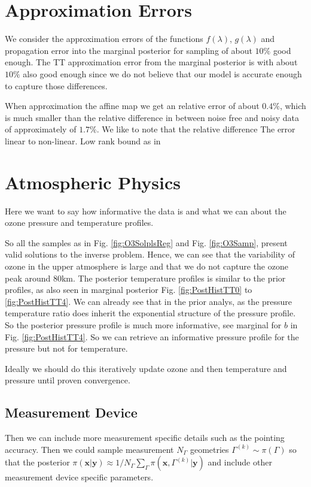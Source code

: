 \section{Approximation Errors}
We consider the approximation errors of the functions $f(\lambda)$, $g(\lambda)$ and propagation error into the marginal posterior for sampling of about $10\%$ good enough.
The TT approximation error from the marginal posterior is with about $10\%$ also good enough since we do not believe that our model is accurate enough to capture those differences.

When approximation the affine map we get an relative error of about $0.4\%$, which is much smaller than the relative difference in between noise free and noisy data of approximately of $1.7 \%$.
We like to note that the relative difference 
The error linear to non-linear.
Low rank bound as in \cite{Rohrbach2022tterror}

\section{Atmospheric Physics}
Here we want to say how informative the data is and what we can about the ozone pressure and temperature profiles.

So all the samples as in Fig. \ref{fig:O3SolplsReg} and Fig. \ref{fig:O3Samp}, present valid solutions to the inverse problem.
Hence, we can see that the variability of ozone in the upper atmosphere is large and that we do not capture the ozone peak around $80$km.
The posterior temperature profiles is similar to the prior profiles, as also seen in marginal posterior Fig. \ref{fig:PostHistTT0} to \ref{fig:PostHistTT4}.
We can already see that in the prior analys, as the pressure temperature ratio does inherit the exponential structure of the pressure profile.
So the posterior pressure profile is much more informative, see marginal for $b$ in Fig. \ref{fig:PostHistTT4}. 
So we can retrieve an informative pressure profile for the pressure but not for temperature.

Ideally we should do this iteratively update ozone and then temperature and pressure until proven convergence.


\subsection{Measurement Device}
Then we can include more measurement specific details such as the pointing accuracy.
Then we could sample measurement $N_{\Gamma}$ geometries $\Gamma^{(k)}\sim \pi(\Gamma)$ so that the posterior $\pi(\bm{x}|\bm{y}) \approx 1/N_{\Gamma} \sum_{\Gamma} \pi(\bm{x}, \Gamma^{(k)}|\bm{y})$ and include other measurement device specific parameters.


